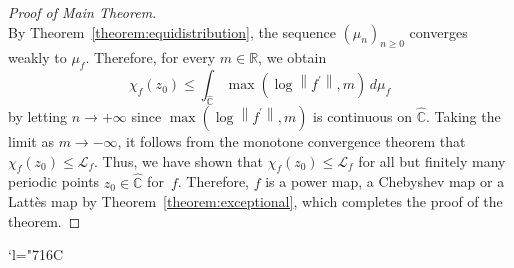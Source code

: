 \documentclass[JEP,XML,SOM,Unicode,published]{cedram}
\newcommand{\Changelback}{\mathcode`l="716C}
\theoremstyle{plain}
\theoremstyle{definition}
\theoremstyle{remark}
\begin{document}
\begin{proof}[Proof of Main Theorem]
\[\]
By Theorem~\ref{theorem:equidistribution}, the sequence $\left(\mu_{n} \right)_{n \geq 0}$ converges weakly to $\mu_{f}$. Therefore, for every $m \in \mathbb{R}$, we obtain
\[
\chi_{f}(z_{0}) \leq \int_{\widehat{\mathbb{C}}} \max\left(\log\left\lVert f^{\prime} \right\rVert, m \right) \, d\mu_{f}
\]
by letting $n \to +\infty$ since $\max\left(\log\left\lVert f^{\prime} \right\rVert, m \right)$ is continuous on $\widehat{\mathbb{C}}$. Taking the limit as $m \to -\infty$, it follows from the monotone convergence theorem that $\chi_{f}(z_{0}) \leq \mathcal{L}_{f}$. Thus, we have shown that $\chi_{f}(z_{0}) \leq \mathcal{L}_{f}$ for all but finitely many periodic points $z_{0} \in \widehat{\mathbb{C}}$ for~$f$. Therefore, $f$ is a power map, a Chebyshev map or a Lattès map by Theorem~\ref{theorem:exceptional}, which completes the proof of the theorem.
\end{proof}

\Changelback

\backmatter


\end{document}
